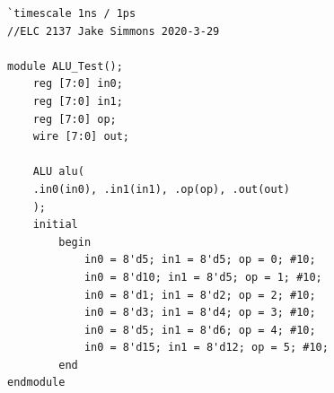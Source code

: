 \documentclass[11pt]{article}
\begin{document}
\begin{lstlisting}[style=Verilog,
caption=ALU Test Bench Code,
label=ALU_Test 
]
`timescale 1ns / 1ps
//ELC 2137 Jake Simmons 2020-3-29

module ALU_Test();
	reg [7:0] in0;
	reg [7:0] in1;
	reg [7:0] op;
	wire [7:0] out;

	ALU alu(
	.in0(in0), .in1(in1), .op(op), .out(out)
	);
	initial 
		begin
			in0 = 8'd5; in1 = 8'd5; op = 0; #10;
			in0 = 8'd10; in1 = 8'd5; op = 1; #10;
			in0 = 8'd1; in1 = 8'd2; op = 2; #10;
			in0 = 8'd3; in1 = 8'd4; op = 3; #10;
			in0 = 8'd5; in1 = 8'd6; op = 4; #10;
			in0 = 8'd15; in1 = 8'd12; op = 5; #10;
		end
endmodule
\end{lstlisting}
\end{document}

